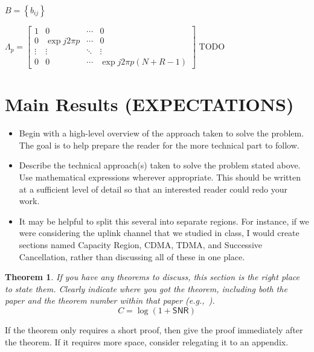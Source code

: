 \documentclass[article,11pt,onecolumn,final]{IEEEtran}
\newtheorem{theorem}{Theorem}
\begin{document}
$B = \left \{b_{ij} \right \} $

$\Lambda_p = 
	\begin{bmatrix}
	 1			&		0				&		\cdots		&		0 \\
	 0			&		\exp{j2\pi p}	&		\cdots		&		0 \\
	 \vdots 	&		\vdots			&		\ddots		&		\vdots \\
	 0			&		0				&		\cdots		&		\exp{j2\pi p(N + R - 1)}
	\end{bmatrix}
$
TODO

\section{Main Results (EXPECTATIONS)}
\begin{itemize}

\item Begin with a high-level overview of the approach taken to solve the problem. The goal is to help prepare the reader for the more technical part to follow.

\item Describe the technical approach(s) taken to solve the problem stated above. Use mathematical expressions wherever appropriate. This should be written at a sufficient level of detail so that an interested reader could redo your work.

\item It may be helpful to split this several into separate regions. For instance, if we were considering the uplink channel that we studied in class, I would create sections named Capacity Region, CDMA, TDMA, and Successive Cancellation, rather than discussing all of these in one place. 

\end{itemize} 

\begin{theorem}
If you have any theorems to discuss, this section is the right place to state them. Clearly indicate where you got the theorem, including both the paper and the theorem number within that paper (e.g.,~\cite[Theorem 2]{Shannon1948}).
\begin{equation}
C = \log(1 + \mathsf{SNR}) \label{e:capacity}
\end{equation}
\end{theorem}
\begin{IEEEproof}
If the theorem only requires a short proof, then give the proof immediately after the theorem. If it requires more space, consider relegating it to an appendix. 
\end{IEEEproof}
\end{document}

